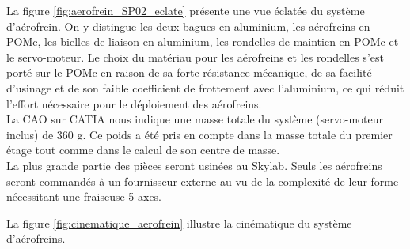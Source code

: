 \begin{minipage}{0.35\textwidth}
    La figure \ref{fig:aerofrein_SP02_eclate} présente une vue éclatée du système d'aérofrein. On y distingue les deux bagues
    en aluminium, les aérofreins en \gls{POMc}, les bielles de liaison en aluminium, les rondelles de maintien en \gls{POMc} et
    le servo-moteur. Le choix du matériau pour les aérofreins et les rondelles s'est porté sur le \gls{POMc} en raison de sa
    forte résistance mécanique, de sa facilité d'usinage et de son faible coefficient de frottement avec l'aluminium, ce qui
    réduit l'effort nécessaire pour le déploiement des aérofreins.\\

    La \acrshort{CAO} sur \acrshort{CATIA} nous indique une masse totale du système (servo-moteur inclus) de 360 g. Ce poids
    a été pris en compte dans la masse totale du premier étage tout comme dans le calcul de son centre de masse.\\
    
    La plus grande partie des pièces seront usinées au \gls{Skylab}. Seuls les aérofreins seront commandés à un fournisseur
    externe au vu de la complexité de leur forme nécessitant une fraiseuse 5 axes.
\end{minipage}


La figure \ref{fig:cinematique_aerofrein} illustre la cinématique du système d'aérofreins.

